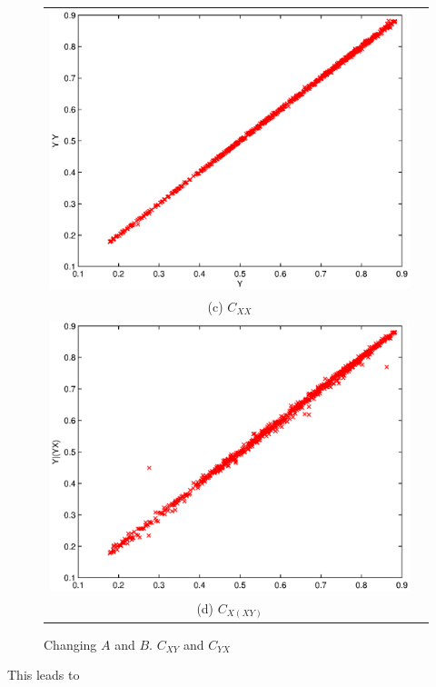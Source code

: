 \documentclass[a4paper,11pt]{article}
\begin{document}
\begin{center}
\begin{figure}[H]
\begin{tabular}{cc}
\includegraphics[scale=0.5]{RLCircuitPlots/SugFig3_YgY.eps} \\
(c) $C_{XX}$ \\[6pt]
\includegraphics[scale=0.5]{RLCircuitPlots/SugFig3_YgYX.eps} \\
(d) $C_{X(XY)}$ \\[6pt]
\end{tabular}
\caption{Changing $A$ and $B$.  $C_{XY}$ and $C_{YX}$}
\label{fig1}
\end{figure}
\end{center}
This leads to
\end{document}
